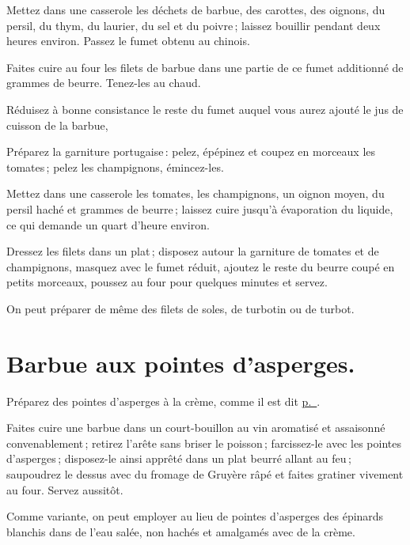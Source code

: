 Mettez dans une casserole les déchets de barbue, des carottes, des oignons, du
persil, du thym, du laurier, du sel et du poivre ; laissez bouillir pendant deux
heures environ. Passez le fumet obtenu au chinois.

Faites cuire au four les filets de barbue dans une partie de ce fumet additionné
de {\mmm} grammes de beurre. Tenez-les au chaud.

Réduisez à bonne consistance le reste du fumet auquel vous aurez ajouté le jus
de cuisson de la barbue,

Préparez la garniture portugaise : pelez, épépinez et coupez en morceaux les
tomates ; pelez les champignons, émincez-les.

Mettez dans une casserole les tomates, les champignons, un oignon moyen, du
persil haché et {\mmm} grammes de beurre ; laissez cuire jusqu'à évaporation du
liquide, ce qui demande un quart d'heure environ.

Dressez les filets dans un plat ; disposez autour la garniture de tomates et de
champignons, masquez avec le fumet réduit, ajoutez le reste du beurre coupé en
petits morceaux, poussez au four pour quelques minutes et servez.

\sk

On peut préparer de même des filets de soles, de turbotin ou de turbot.

\section*{\centering Barbue aux pointes d'asperges.}

Préparez des pointes d'asperges à la crème, comme il est dit
\hyperlink{p0760}{p. \pageref{pg0760}}.

Faites cuire une barbue dans un court-bouillon au vin aromatisé et assaisonné
convenablement ; retirez l'arête sans briser le poisson ; farcissez-le avec les
pointes d'asperges ; disposez-le ainsi apprêté dans un plat beurré allant au
feu ; saupoudrez le dessus avec du fromage de Gruyère râpé et faites gratiner
vivement au four. Servez aussitôt.

\sk

Comme variante, on peut employer au lieu de pointes d'asperges des épinards
blanchis dans de l'eau salée, non hachés et amalgamés avec de la crème.

